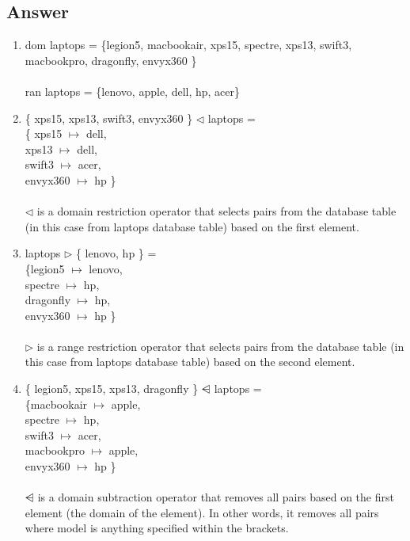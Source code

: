 \subsection{Answer}
\begin{enumerate}

\item dom laptops = \{legion5, macbookair, xps15, spectre, xps13, swift3, macbookpro, dragonfly, envyx360 \}
\\ \\
ran laptops = \{lenovo, apple, dell, hp, acer\} \\

\item \{ xps15, xps13, swift3, envyx360 \}  $\lhd$ laptops  = \\
\{ xps15 $\mapsto$ dell, \\
xps13 $\mapsto$ dell, \\
swift3 $\mapsto$ acer, \\
envyx360 $\mapsto$ hp \}
\\ \\
$\lhd$ is a domain restriction operator that selects pairs from the database table (in this case from laptops database table) based on the first element. \\
 
\item laptops $\rhd$ \{ lenovo, hp \} = \\
\{legion5 $\mapsto$ lenovo, \\
spectre $\mapsto$ hp, \\
dragonfly $\mapsto$ hp, \\
envyx360 $\mapsto$ hp \}
\\ \\
$\rhd$ is a range restriction operator that selects pairs from the database table (in this case from laptops database table) based on the second element. \\

\item \{ legion5, xps15, xps13, dragonfly \} $\ndres$  laptops = \\
\{macbookair $\mapsto$ apple, \\
spectre $\mapsto$ hp, \\
swift3 $\mapsto$ acer, \\
macbookpro $\mapsto$ apple, \\
envyx360 $\mapsto$ hp \}
\\ \\
$\ndres$ is a domain subtraction operator that removes all pairs based on the first element (the domain of the element). In other words, it removes all pairs where model is anything specified within the brackets. \\


\end{enumerate}
